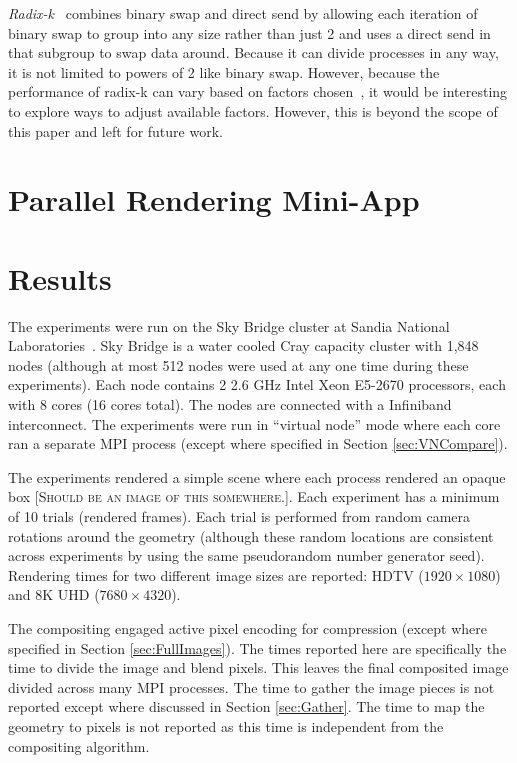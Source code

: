 \documentclass{vgtc}                          %
\newcommand*{\lcite}[1]{~\cite{#1}}
\newcommand*{\keyterm}[1]{\emph{#1}}
\newcommand{\fix}[1]{{\color{red}\textsc{[#1]}}}
\begin{document}
\keyterm{Radix-k}\lcite{RadixK} combines binary swap and direct send by allowing each iteration of binary swap to group into any size rather than just 2 and uses a direct send in that subgroup to swap data around.
Because it can divide processes in any way, it is not limited to powers of 2 like binary swap.
However, because the performance of radix-k can vary based on factors chosen\lcite{Kendall2010,Moreland2011:SC}, it would be interesting to explore ways to adjust available factors.
However, this is beyond the scope of this paper and left for future work.

\section{Parallel Rendering Mini-App}

\section{Results}
\label{sec:Results}

The experiments were run on the Sky Bridge cluster at Sandia National Laboratories\lcite{SkyBridge}.
Sky Bridge is a water cooled Cray capacity cluster with 1,848 nodes (although at most 512 nodes were used at any one time during these experiments).
Each node contains 2 2.6 GHz Intel Xeon E5-2670 processors, each with 8 cores (16 cores total).
The nodes are connected with a Infiniband interconnect.
The experiments were run in ``virtual node'' mode where each core ran a separate MPI process (except where specified in Section \ref{sec:VNCompare}).

The experiments rendered a simple scene where each process rendered an opaque box \fix{Should be an image of this somewhere.}.
Each experiment has a minimum of 10 trials (rendered frames).
Each trial is performed from random camera rotations around the geometry (although these random locations are consistent across experiments by using the same pseudorandom number generator seed).
Rendering times for two different image sizes are reported: HDTV ($1920 \times 1080$) and 8K UHD ($7680 \times 4320$).

The compositing engaged active pixel encoding for compression (except where specified in Section \ref{sec:FullImages}).
The times reported here are specifically the time to divide the image and blend pixels.
This leaves the final composited image divided across many MPI processes.
The time to gather the image pieces is not reported except where discussed in Section \ref{sec:Gather}.
The time to map the geometry to pixels is not reported as this time is independent from the compositing algorithm.
\end{document}

